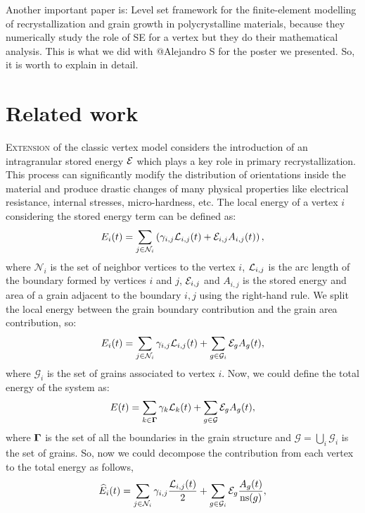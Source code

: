 Another important paper is: Level set framework for the finite-element modelling of recrystallization and grain growth in polycrystalline materials, because they numerically study the role of SE for a vertex but they do their mathematical analysis. This is what we did with @Alejandro S for the poster we presented. So, it is worth to explain in detail.

\section{Related work}

 \lettrine{E}{xtension} of the classic vertex model considers the introduction of an intragranular stored energy $\mathcal{E}$ which plays a key role in primary recrystallization. This process can significantly modify the distribution of orientations inside the material and produce drastic changes of many physical properties like electrical resistance, internal stresses, micro-hardness, etc.\cite{pikekos2008generalized, pikekos2008stochastic}
 The local energy of a vertex $i$ considering the stored energy term can be defined as:
 \begin{equation}
     E_i(t) = \sum_{j \in \mathcal{N}_i}\left(\gamma_{i,j}\mathcal{L}_{i,j}(t) + \mathcal{E}_{i,j}A_{i,j}(t)\right),
 \end{equation}
 where $\mathcal{N}_i$ is the set of neighbor vertices to the vertex $i$, $\mathcal{L}_{i,j}$ is the arc length of the boundary formed by vertices $i$ and $j$, $\mathcal{E}_{i,j}$ and $A_{i,j}$ is the stored energy and area of a grain adjacent to the boundary $i,j$ using the right-hand rule. We split the local energy between the grain boundary contribution and the grain area contribution, so:
 \begin{equation}
     E_i(t) = \sum_{j \in \mathcal{N}_i}\gamma_{i,j}\mathcal{L}_{i,j}(t) + \sum_{g \in \mathcal{G}_i} \mathcal{E}_{g}A_{g}(t),
 \end{equation}
 where $\mathcal{G}_i$ is the set of grains associated to vertex $i$. Now, we could define the total energy of the system as:
 \begin{equation}
     E(t) = \sum_{k \in \bm{\Gamma}}\gamma_{k}\mathcal{L}_{k}(t) + 
     \sum_{g \in \mathcal{G}} \mathcal{E}_{g}A_{g}(t),
     \label{eq:SEtotalenergy}
 \end{equation}
 where $\bm{\Gamma}$ is the set of all the boundaries in the grain structure
 and $\mathcal{G}=\bigcup_i \mathcal{G}_i$ is the set of grains.
 So, now we could decompose the contribution
 from each vertex to the total energy as follows,
 \begin{equation}
     \widehat{E}_i(t) = \sum_{j \in \mathcal{N}_i}\gamma_{i,j}\dfrac{\mathcal{L}_{i,j}(t)}{2} + \sum_{g \in \mathcal{G}_i} \mathcal{E}_{g}\dfrac{A_{g}(t)}{\operatorname{ns}(g)},
         \label{eq:SEvertexenergy}
 \end{equation}
